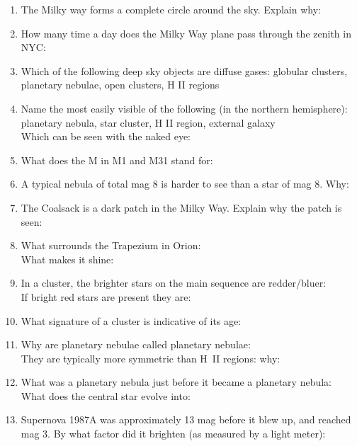 \documentclass[11pt]{article}
\begin{document}
\begin{enumerate} 

\item
The Milky way forms a complete circle around the sky.  Explain why:


\item 
How many time a day does the Milky Way plane pass through the zenith
in NYC:


\item 
Which of the following deep sky objects are diffuse gases:
globular clusters, planetary nebulae, open clusters, H II regions

\item 
Name the most easily visible of the following (in the northern hemisphere): \\
planetary nebula, star cluster, H II region, external galaxy \\
Which can be seen with the naked eye:  

\item
What does the M in M1 and M31 stand for:


\item A typical nebula of total mag 8 is harder to see than a star of 
mag 8. Why:


\item 
The Coalsack is a  dark patch in the Milky Way. Explain why the patch
is seen:


\item 
What surrounds the Trapezium in Orion: \\
What makes it shine:

\item
In a cluster, the brighter stars on the main sequence are
redder/bluer: \\
If bright red stars are present they are:

\item 
What signature of a cluster is indicative of its age:

\item
Why are planetary nebulae called planetary nebulae: \\
They are typically more symmetric than H~II regions: why:

\item 
What was a planetary nebula just before it became a  planetary
nebula:\\
What does the central star evolve into:


\item 
Supernova 1987A was approximately 13 mag before it blew up, and
reached mag 3. By what factor did it brighten (as measured by a light meter):



\end{enumerate}
\end{document}
